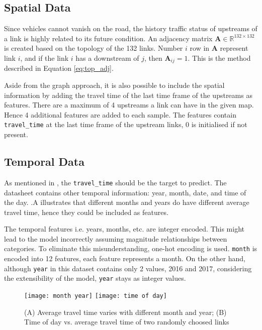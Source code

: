 \subsection{Spatial Data} \label{Section:SpatialData}

Since vehicles cannot vanish on the road, the history traffic status of upstreams of a link is highly related to its future condition. 
An adjacency matrix $\mathbf{A} \in \mathbb{R}^{132\times 132}$ is created based on the topology of the 132 links. 
Number $i$ row in $\mathbf{A}$ represent link $i$, and if the link $i$ has a downstream of $j$, then $\mathbf{A}_{ij} = 1$. 
This is the method described in Equation \ref{eq:top_adj}. 

Aside from the graph approach, it is also possible to include the spatial information by adding the travel time of the last time frame of the upstreams as features. 
There are a maximum of 4 upstreams a link can have in the given map. Hence 4 additional features are added to each sample. 
The features contain \verb|travel_time| at the last time frame of the upstream links, $0$ is initialised if not present. 

\subsection{Temporal Data} \label{Section:TemporalData}

As mentioned in , the \verb|travel_time| should be the target to predict. 
The datasheet contains other temporal information: year, month, date, and time of the day. 
.A illustrates that different months and years do have different average travel time, hence they could be included as features. 

The temporal features i.e. years, months, etc. are integer encoded. This might lead to the model incorrectly assuming magnitude relationships between categories. 
To eliminate this misunderstanding, one-hot encoding is used. \verb|month| is encoded into 12 features, each feature represents a month. 
On the other hand, although \verb|year| in this dataset contains only 2 values, 2016 and 2017, considering the extensibility of the model, \verb|year| stays as integer values. 

\begin{figure}[!htb]
    \centering
    \texttt{[image: month year]}
    \texttt{[image: time of day]}
    \caption{(A) Average travel time varies with different month and year; (B) Time of day vs. average travel time of two randomly choosed links}
    \label{Figure:day_month_year}
\end{figure}

